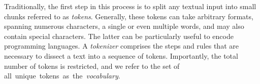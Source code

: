 \documentclass[11pt]{article}
\begin{document}
Traditionally, the first step in this process is to split any textual input into small chunks referred to as \textit{tokens}. Generally, these tokens can take arbitrary formats, spanning numerous characters, a single or even multiple words, and may also contain special characters. The latter can be particularly useful to encode programming languages. 
A \textit{tokenizer} comprises the steps and rules that are necessary to dissect a text into a sequence of tokens. Importantly, the total number of tokens is restricted, and we refer to the set of \mbox{all unique tokens as the \textit{vocabulary}.} 
\end{document}
